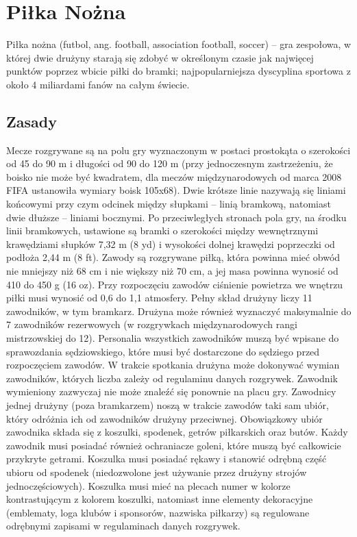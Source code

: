 \documentclass[14pt,oneside,a4paper]{book}
\theoremstyle{break}
\begin{document}
\chapter {Piłka Nożna}

Piłka nożna (futbol, ang. football, association football, soccer) – gra zespołowa, w której dwie drużyny starają się zdobyć w określonym czasie jak najwięcej punktów poprzez wbicie piłki do bramki; najpopularniejsza dyscyplina sportowa z około 4 miliardami fanów na całym świecie.

\section {Zasady}

Mecze rozgrywane są na polu gry wyznaczonym w postaci prostokąta o szerokości od 45 do 90 m i długości od 90 do 120 m (przy jednoczesnym zastrzeżeniu, że boisko nie może być kwadratem, dla meczów międzynarodowych od marca 2008 FIFA ustanowiła wymiary boisk 105x68). Dwie krótsze linie nazywają się liniami końcowymi przy czym odcinek między słupkami – linią bramkową, natomiast dwie dłuższe – liniami bocznymi. Po przeciwległych stronach pola gry, na środku linii bramkowych, ustawione są bramki o szerokości między wewnętrznymi krawędziami słupków 7,32 m (8 yd) i wysokości dolnej krawędzi poprzeczki od podłoża 2,44 m (8 ft). Zawody są rozgrywane piłką, która powinna mieć obwód nie mniejszy niż 68 cm i nie większy niż 70 cm, a jej masa powinna wynosić od 410 do 450 g (16 oz). Przy rozpoczęciu zawodów ciśnienie powietrza we wnętrzu piłki musi wynosić od 0,6 do 1,1 atmosfery.
Pełny skład drużyny liczy 11 zawodników, w tym bramkarz.  Drużyna może również wyznaczyć maksymalnie do 7 zawodników rezerwowych (w rozgrywkach międzynarodowych rangi mistrzowskiej do 12). Personalia wszystkich zawodników muszą być wpisane do sprawozdania sędziowskiego, które musi być dostarczone do sędziego przed rozpoczęciem zawodów. W trakcie spotkania drużyna może dokonywać wymian zawodników, których liczba zależy od regulaminu danych rozgrywek. Zawodnik wymieniony zazwyczaj nie może znaleźć się ponownie na placu gry.
Zawodnicy jednej drużyny (poza bramkarzem) noszą w trakcie zawodów taki sam ubiór, który odróżnia ich od zawodników drużyny przeciwnej. Obowiązkowy ubiór zawodnika składa się z koszulki, spodenek, getrów piłkarskich oraz butów. Każdy zawodnik musi posiadać również ochraniacze goleni, które muszą być całkowicie przykryte getrami. Koszulka musi posiadać rękawy i stanowić odrębną część ubioru od spodenek (niedozwolone jest używanie przez drużyny strojów jednoczęściowych). Koszulka musi mieć na plecach numer w kolorze kontrastującym z kolorem koszulki, natomiast inne elementy dekoracyjne (emblematy, loga klubów i sponsorów, nazwiska piłkarzy) są regulowane odrębnymi zapisami w regulaminach danych rozgrywek.
\end{document}
